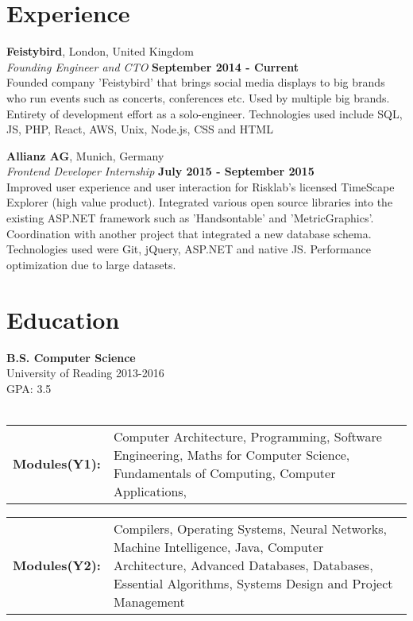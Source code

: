 \documentclass[line, margin, 10pt]{res}
\begin{document}
\renewcommand{\namefont}{ \LARGE \bf }

\address{r.watkins@student.reading.ac.uk}
\address{feistybird.com}

\begin{resume}
\section{Experience}


{\bf Feistybird}, London, United Kingdom\\
\textit{Founding Engineer and CTO} \hfill {\bf September 2014 - Current}\\
Founded company 'Feistybird' that brings social media displays to big brands who run events such as concerts, conferences etc. Used by multiple big brands. Entirety of development effort as a solo-engineer.
Technologies used include SQL, JS, PHP, React, AWS, Unix, Node.js, CSS and HTML

{\bf Allianz AG}, Munich, Germany\\
{\it Frontend Developer Internship} {\bf \hfill July 2015 - September 2015}\\
Improved user experience and user interaction for Risklab's licensed TimeScape Explorer (high value product). Integrated various open source libraries into the existing ASP.NET framework such as 'Handsontable' and 'MetricGraphics'.
 Coordination with another project that integrated a new database schema. Technologies used were Git, jQuery, ASP.NET and native JS. Performance optimization due to large datasets.

\section{Education}
{\bf B.S. Computer Science}\\
University of Reading \hfill {2013-2016}\\
GPA: 3.5\\\\
\begin{tabular}[t]{@{} p{1.2in} p{3.75in} @{}}
\bf{Modules(Y1):}  & Computer Architecture,
  Programming, 
  Software Engineering,
  Maths for Computer Science,
  Fundamentals of Computing,
  Computer Applications,
\end{tabular}

\begin{tabular}[t]{@{} p{1.2in} p{3.75in} @{}}  
\bf{Modules(Y2):}  & Compilers,
  Operating Systems,
  Neural Networks,
  Machine Intelligence,
  Java,
  Computer Architecture,
  Advanced Databases,
  Databases,
  Essential Algorithms,
  Systems Design and Project Management
\end{tabular}


\end{resume}
\end{document}
